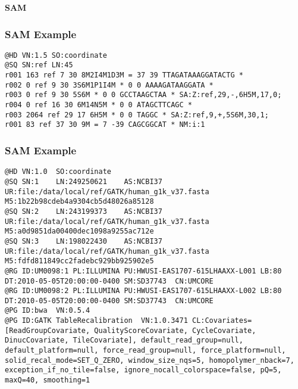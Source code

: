 \documentclass{beamer}
\newcommand{\centeredtitle}[1]{
\begin{center}
    \Huge{\bf{#1}}
\end{center}
}
\newcommand{\hugeslide}[1]{
\begin{frame}
\centeredtitle{#1}
\end{frame}
}
\begin{document}
\hugeslide{SAM}


\begin{frame}[fragile]
\frametitle{SAM Example}
\begin{framed}\small
\begin{verbatim}
@HD VN:1.5 SO:coordinate
@SQ SN:ref LN:45
r001 163 ref 7 30 8M2I4M1D3M = 37 39 TTAGATAAAGGATACTG *
r002 0 ref 9 30 3S6M1P1I4M * 0 0 AAAAGATAAGGATA *
r003 0 ref 9 30 5S6M * 0 0 GCCTAAGCTAA * SA:Z:ref,29,-,6H5M,17,0;
r004 0 ref 16 30 6M14N5M * 0 0 ATAGCTTCAGC *
r003 2064 ref 29 17 6H5M * 0 0 TAGGC * SA:Z:ref,9,+,5S6M,30,1;
r001 83 ref 37 30 9M = 7 -39 CAGCGGCAT * NM:i:1
\end{verbatim}
\end{framed}
\end{frame}

\begin{frame}[fragile]
\frametitle{SAM Example}
\begin{framed}\small
\begin{verbatim}
@HD	VN:1.0	SO:coordinate
@SQ	SN:1	LN:249250621	AS:NCBI37	UR:file:/data/local/ref/GATK/human_g1k_v37.fasta	M5:1b22b98cdeb4a9304cb5d48026a85128
@SQ	SN:2	LN:243199373	AS:NCBI37	UR:file:/data/local/ref/GATK/human_g1k_v37.fasta	M5:a0d9851da00400dec1098a9255ac712e
@SQ	SN:3	LN:198022430	AS:NCBI37	UR:file:/data/local/ref/GATK/human_g1k_v37.fasta	M5:fdfd811849cc2fadebc929bb925902e5
@RG	ID:UM0098:1	PL:ILLUMINA	PU:HWUSI-EAS1707-615LHAAXX-L001	LB:80	DT:2010-05-05T20:00:00-0400	SM:SD37743	CN:UMCORE
@RG	ID:UM0098:2	PL:ILLUMINA	PU:HWUSI-EAS1707-615LHAAXX-L002	LB:80	DT:2010-05-05T20:00:00-0400	SM:SD37743	CN:UMCORE
@PG	ID:bwa	VN:0.5.4
@PG	ID:GATK TableRecalibration	VN:1.0.3471	CL:Covariates=[ReadGroupCovariate, QualityScoreCovariate, CycleCovariate, DinucCovariate, TileCovariate], default_read_group=null, default_platform=null, force_read_group=null, force_platform=null, solid_recal_mode=SET_Q_ZERO, window_size_nqs=5, homopolymer_nback=7, exception_if_no_tile=false, ignore_nocall_colorspace=false, pQ=5, maxQ=40, smoothing=1
\end{verbatim}
\end{framed}
\end{frame}
\end{document}
